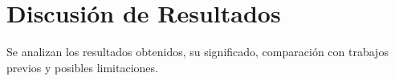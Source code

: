
\section{Discusión de Resultados}
Se analizan los resultados obtenidos, su significado, comparación con trabajos previos y posibles limitaciones.










